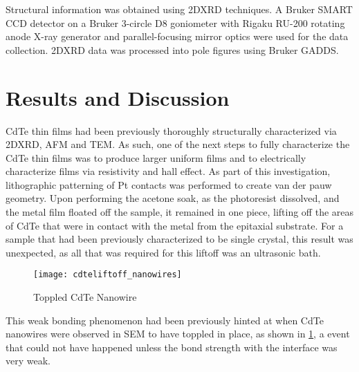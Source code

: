 Structural information was obtained using 2DXRD techniques. A Bru\-ker SMART CCD 
detector on a Bruker 3-circle D8 goniometer with Rigaku RU-200 rotating anode X-ray 
generator and parallel-focusing mirror optics were used for the data collection. 2DXRD 
data was processed into pole figures using Bruker GADDS.
\section{Results and Discussion}
CdTe thin films had been previously thoroughly structurally characterized via 2DXRD, AFM 
and TEM. As such, one of the next steps to fully characterize the CdTe thin films was to 
produce larger uniform films\cite{stephen-thesis} and to electrically characterize films 
via resistivity and hall effect. As part of this investigation, lithographic patterning 
of Pt contacts was performed to create van der pauw geometry. Upon performing the acetone 
soak, as the photoresist dissolved, and the metal film floated off the sample, it 
remained in one piece, lifting off the areas of CdTe that were in contact with the metal from the epitaxial substrate. 
For a sample that had been previously characterized to be single crystal, this result was 
unexpected, as all that was required for this liftoff was an ultrasonic bath.
\begin{figure}
    \centering
    \texttt{[image: cdteliftoff\_nanowires]}
    \caption{\label{fig:cdteliftoff_nanowires}Toppled CdTe Nanowire}
\end{figure}
This weak bonding phenomenon had been previously hinted at when CdTe nanowires were 
observed in SEM to have toppled in place, as shown in \cref{fig:cdteliftoff_nanowires}, a 
event that could not have happened unless the bond strength with the interface was very 
weak.

